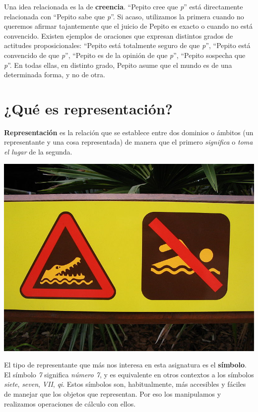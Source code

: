 \documentclass{tufte-handout}
\begin{document}
Una idea relacionada es la de \textbf{creencia}. ``Pepito cree que
\emph{p}'' está directamente relacionada con ``Pepito sabe que
\emph{p}''. Si acaso, utilizamos la primera cuando no queremos afirmar
tajantemente que el juicio de Pepito es exacto o cuando no está
convencido. Existen ejemplos de oraciones que expresan distintos grados
de actitudes proposicionales: ``Pepito está totalmente seguro de que
\emph{p}'', ``Pepito está convencido de que \emph{p}'', ``Pepito es de
la opinión de que \emph{p}'', ``Pepito sospecha que \emph{p}''. En todas
ellas, en distinto grado, Pepito asume que el mundo es de una
determinada forma, y no de otra.

\section{¿Qué es representación?}\label{que-es-representacion}

\textbf{Representación} es la relación que se establece entre dos
dominios o ámbitos (un representante y una cosa representada) de manera
que el primero \emph{significa} o \emph{toma el lugar} de la segunda.

\includegraphics{img/pictogram.jpg}

El tipo de representante que más nos interesa en esta asignatura es el
\textbf{símbolo}. El símbolo \emph{7} significa \emph{número 7}, y es
equivalente en otros contextos a los símbolos \emph{siete},
\emph{seven}, \emph{VII}, \emph{qi}. Estos símbolos son, habitualmente,
más accesibles y fáciles de manejar que los objetos que representan. Por
eso los manipulamos y realizamos operaciones de cálculo con ellos.
\end{document}
